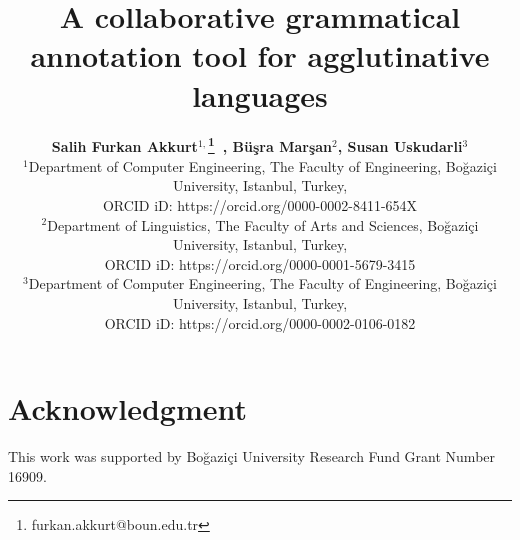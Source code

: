 \documentclass{elektr}
\title{A collaborative grammatical annotation tool for agglutinative languages}
\author[AKKURT et al.]{
\textbf{Salih Furkan Akkurt$^{1,}$\thanks{furkan.akkurt@boun.edu.tr}~, Büşra Marşan$^{2}$, Susan Uskudarli$^{3}$}\\
$^{1}$Department of Computer Engineering, The Faculty of Engineering, Boğaziçi University, Istanbul, Turkey, \\ ORCID iD: https://orcid.org/0000-0002-8411-654X\\
$^{2}$Department of Linguistics, The Faculty of Arts and Sciences, Boğaziçi University, Istanbul, Turkey,\\ ORCID iD: https://orcid.org/0000-0001-5679-3415\\
$^{3}$Department of Computer Engineering, The Faculty of Engineering, Boğaziçi University, Istanbul, Turkey,\\ORCID iD: https://orcid.org/0000-0002-0106-0182
\\ [1.8em]

\rec{.202}
\acc{.202}
\finv{..202}
}
\begin{document}
\maketitle












\section*{Acknowledgment}
This work was supported by Boğaziçi University Research Fund Grant Number 16909.



% 
\end{document}
